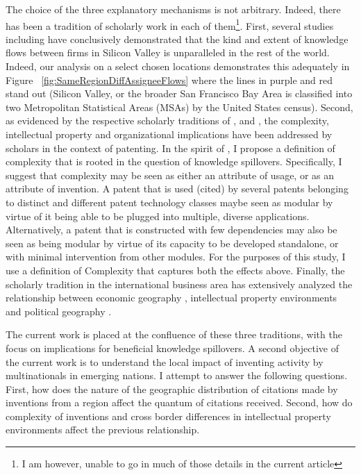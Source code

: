 \documentclass[12pt]{article}
\begin{document}
The choice of the three explanatory mechanisms is not arbitrary. Indeed, there has been a tradition of scholarly work in each of them\footnote{I am however, unable to go in much of those details in the current article}. First, several studies including \cite{Almeida1999} have conclusively demonstrated that the kind and extent of knowledge flows between firms in Silicon Valley is unparalleled in the rest of the world. Indeed, our analysis on a select chosen locations demonstrates this adequately in Figure ~\ref{fig:SameRegionDiffAssigneeFlows} where the lines in purple and red stand out (Silicon Valley, or the broader San Francisco Bay Area is classified into two Metropolitan Statistical Areas (MSAs) by the United States census). Second, as evidenced by the respective scholarly traditions of \cite{Baldwin2015}, \cite{Ethiraj2004b}  and \cite{Yayavaram2008}, the complexity, intellectual property and organizational implications have been addressed by scholars in the context of patenting. In the spirit of \cite{Ethiraj2004b}, I propose a definition of complexity that is rooted in the question of knowledge spillovers. Specifically, I suggest that complexity may be seen as either an attribute of usage, or as an attribute of invention. A patent that is used (cited) by several patents belonging to distinct and different patent technology classes maybe seen as modular by virtue of it being able to be plugged into multiple, diverse applications. Alternatively, a patent that is constructed with few dependencies may also be seen as being modular by virtue of its capacity to be developed standalone, or with minimal intervention from other modules. For the purposes of this study, I use a definition of Complexity that captures both the effects above. Finally, the scholarly tradition in the international business area has extensively analyzed the relationship between economic geography \cite{Singh2007}, intellectual property environments \citep{Zhao2006} and political geography \citep{Singh2013}.

The current work is placed at the confluence of these three traditions, with the focus on implications for beneficial knowledge spillovers. A second objective of the current work is to understand the local impact of inventing activity by multinationals in emerging nations. I attempt to answer the following questions. First, how does the nature of the geographic distribution of citations made by inventions from a region affect the quantum of citations received. Second, how do complexity of inventions and cross border differences in intellectual property environments affect the previous relationship. 
\end{document}

